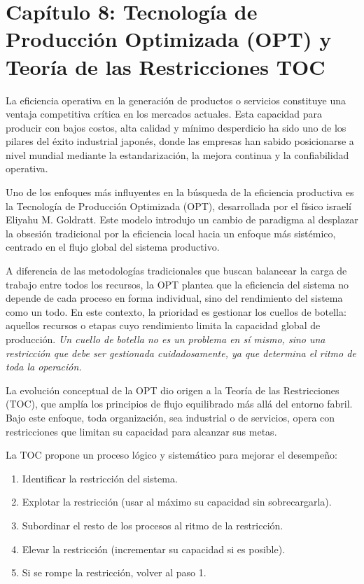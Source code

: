 \documentclass[a4paper,oneside,11pt]{article}
\begin{document}
\clearpage

\section{Capítulo 8: Tecnología de Producción Optimizada (OPT) y Teoría de las Restricciones TOC}

La eficiencia operativa en la generación de productos o servicios constituye una ventaja competitiva crítica en los mercados actuales. Esta capacidad para producir con bajos costos, alta calidad y mínimo desperdicio ha sido uno de los pilares del éxito industrial japonés, donde las empresas han sabido posicionarse a nivel mundial mediante la estandarización, la mejora continua y la confiabilidad operativa.

Uno de los enfoques más influyentes en la búsqueda de la eficiencia productiva es la Tecnología de Producción Optimizada (OPT), desarrollada por el físico israelí Eliyahu M. Goldratt. Este modelo introdujo un cambio de paradigma al desplazar la obsesión tradicional por la eficiencia local hacia un enfoque más sistémico, centrado en el flujo global del sistema productivo.

A diferencia de las metodologías tradicionales que buscan balancear la carga de trabajo entre todos los recursos, la OPT plantea que la eficiencia del sistema no depende de cada proceso en forma individual, sino del rendimiento del sistema como un todo. En este contexto, la prioridad es gestionar los cuellos de botella: aquellos recursos o etapas cuyo rendimiento limita la capacidad global de producción. \textit{Un cuello de botella no es un problema en sí mismo, sino una restricción que debe ser gestionada cuidadosamente, ya que determina el ritmo de toda la operación.}

La evolución conceptual de la OPT dio origen a la Teoría de las Restricciones (TOC), que amplía los principios de flujo equilibrado más allá del entorno fabril. Bajo este enfoque, toda organización, sea industrial o de servicios, opera con restricciones que limitan su capacidad para alcanzar sus metas.

La TOC propone un proceso lógico y sistemático para mejorar el desempeño:

\begin{enumerate}
    \item Identificar la restricción del sistema.
    \item Explotar la restricción (usar al máximo su capacidad sin sobrecargarla).
    \item Subordinar el resto de los procesos al ritmo de la restricción.
    \item Elevar la restricción (incrementar su capacidad si es posible).
    \item Si se rompe la restricción, volver al paso 1.
\end{enumerate}
\end{document}
